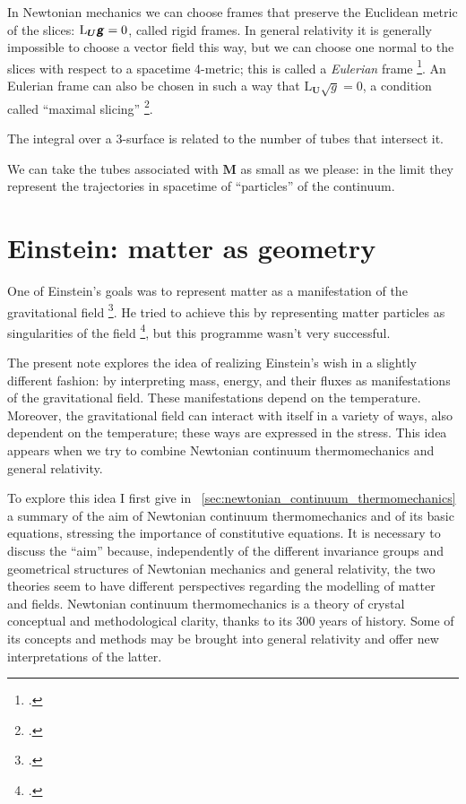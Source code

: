 \documentclass[\ifafour a4paper,12pt,\else a5paper,10pt,\fi%
onecolumn,oneside,article,%
british%
]{memoir}
\theoremstyle{remark}
\theoremstyle{innote}
\newcommand*{\mathte}[1]{\textbf{\textit{\textsf{#1}}}}
\newcommand*{\citep}{\footcites}
\renewcommand*{\|}[1][]{\nonscript\,#1\vert\nonscript\;\mathopen{}}
\newcommand*{\sect}{\S}%
\newcommand*{\puzzle}{{\fontencoding{U}\fontfamily{fontawesometwo}\selectfont\symbol{225}}}
\newcommand*{\psect}{{\footnotesize\puzzle}}%
\newcommand*{\Li}{\mathrm{L}}
\newcommand*{\yrr}{M}
\newcommand*{\yr}{\bm{\yrr}}
\newcommand*{\yFF}{U}
\newcommand*{\yF}{\bm{\yFF}}
\newcommand*{\ygg}{g}
\newcommand*{\yg}{\mathte{\ygg}}
\newcommand*{\ygv}{\sqrt{\ygg}}
\begin{document}
\bigskip

In Newtonian mechanics we can choose frames that preserve the Euclidean
metric of the slices: $\Li_{\yF}\yg = 0$, called rigid frames. In general
relativity it is generally impossible to choose a vector field this way,
but we can choose one normal to the slices with respect to a spacetime
4-metric; this is called a \emph{Eulerian} frame
\citep{smarretal1978,smarretal1980}. An Eulerian frame can also be chosen in
such a way that $\Li_{\yF}\ygv=0$, a condition called \enquote{maximal
  slicing} \citep[\sect~III.B]{smarretal1978}.

The integral over a 3-surface is related
to the number of tubes that intersect it.

We can take the tubes associated with $\yr$ as small as we please: in the
limit they represent the trajectories in spacetime of \enquote{particles}
of the continuum.


\section{Einstein: matter as geometry}
\label{sec:einstein_matter_fields}

One of Einstein's goals was to represent matter as a manifestation of the
gravitational field \citep[see][]{havasetal1962,havas1967}. He tried to
achieve this by representing matter particles as singularities of the field
\citep{einsteinetal1938}, but this programme wasn't very successful.

The present note explores the idea of realizing Einstein's wish in a
slightly different fashion: by interpreting mass, energy, and their fluxes
as manifestations of the gravitational field. These manifestations depend
on the temperature. Moreover, the gravitational field can interact with
itself in a variety of ways, also dependent on the temperature; these ways
are expressed in the stress. This idea appears when we try to combine
Newtonian continuum thermomechanics and general relativity.

To explore this idea I first give in
\psect~\ref{sec:newtonian_continuum_thermomechanics} a summary of the aim of
Newtonian continuum thermomechanics and of its basic equations, stressing
the importance of constitutive equations. It is necessary to discuss the
\enquote{aim} because, independently of the different invariance groups and
geometrical structures of Newtonian mechanics and general relativity, the
two theories seem to have different perspectives regarding the modelling of
matter and fields. Newtonian continuum thermomechanics is a theory of
crystal conceptual and methodological clarity, thanks to its 300 years of
history. Some of its concepts and methods may be brought into general
relativity and offer new interpretations of the latter.
\end{document}
